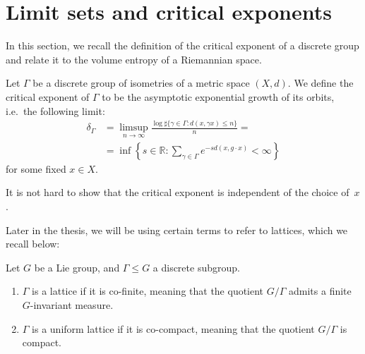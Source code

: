 \documentclass{report}
\begin{document}
\section{Limit sets and critical exponents}
In this section, we recall the definition of the critical exponent of a discrete group and relate it to the volume entropy of a Riemannian space.
\begin{definition}\label{def:group_critical_exponent}
    Let $\Gamma$ be a discrete group of isometries of a metric space $(X,d)$.
    We define the critical exponent of $\Gamma$ to be the asymptotic exponential growth of its orbits, i.e.\ the following limit:
    \begin{align*}
        \delta_\Gamma &= \limsup_{n\to \infty} \frac{\log \sharp \{ \gamma \in \Gamma : d(x, \gamma x) \leq n \}}{n} =\\
        &= \inf \left\{ 
            s \in \mathbb R : \sum_{\gamma \in \Gamma} e^{-s d(x, g \cdot x)}
        < \infty \right\}
    \end{align*}
    for some fixed $x \in X$.
\end{definition}
\begin{remark}
    It is not hard to show that the critical exponent is independent of the choice of~$x$.    
\end{remark}


Later in the thesis, we will be using certain terms to refer to lattices, which we recall below:
\begin{definition}
    Let $G$ be a Lie group, and $\Gamma \leq G$ a discrete subgroup. 
    \begin{enumerate}[label=(\roman*)]
        \item $\Gamma$ is a lattice if it is co-finite, meaning that the quotient $G/\Gamma$ admits a finite $G$-invariant measure.
        \item $\Gamma$ is a uniform lattice if it is co-compact, meaning that the quotient $G/\Gamma$ is compact.
    \end{enumerate}
\end{definition}
\end{document}
